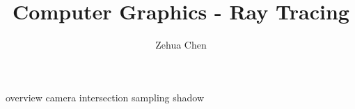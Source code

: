 \documentclass[letterpaper, 11pt]{report}
\title{Computer Graphics - Ray Tracing}
\author{Zehua Chen}
\begin{document}
  \maketitle
  \tableofcontents

  {overview}
  {camera}
  {intersection}
  {sampling}
  {shadow}

  \newpage
  \printglossary
\end{document}
